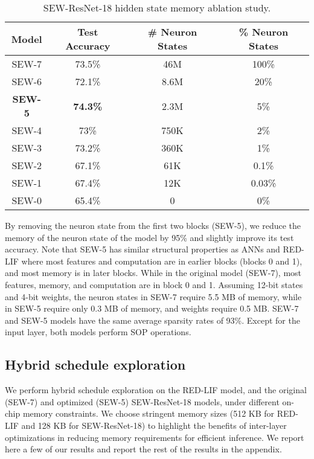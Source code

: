 \begin{table}[!t]
\caption{SEW-ResNet-18 hidden state memory ablation study.}
\label{tab:sew}
\centering
\begin{tabular}{|c||c|c|c|}
\hline
Model & Test Accuracy & \# Neuron States & \% Neuron States\\
\hline
SEW-7 & 73.5\% & 46M & 100\%\\
SEW-6 & 72.1\% & 8.6M & 20\%\\
\textbf{SEW-5} & \textbf{74.3\%} & 2.3M & 5\%\\
SEW-4 & 73\% & 750K & 2\%\\
SEW-3 & 73.2\% & 360K & 1\%\\
SEW-2 & 67.1\% & 61K & 0.1\% \\
SEW-1 & 67.4\% & 12K & 0.03\%\\
SEW-0 & 65.4\% & 0 & 0\%\\
\hline
\end{tabular}
\end{table}

By removing the neuron state from the first two blocks (SEW-5), we reduce the memory of the neuron state of the model by 95\% and slightly improve its test accuracy. Note that SEW-5 has similar structural properties as ANNs and RED-LIF where most features and computation are in earlier blocks (blocks 0 and 1), and most memory is in later blocks. While in the original model (SEW-7), most features, memory, and computation are in block 0 and 1. Assuming 12-bit states and 4-bit weights, the neuron states in SEW-7 require 5.5 MB of memory, while in SEW-5 require only 0.3 MB of memory, and weights require 0.5 MB. SEW-7 and SEW-5 models have the same average sparsity rates of 93\%. Except for the input layer, both models perform SOP operations. 

\subsection{Hybrid schedule exploration}
\label{sec:Shd}



We perform hybrid schedule exploration on the RED-LIF model, and the original (SEW-7) and optimized (SEW-5) SEW-ResNet-18 models, under different on-chip memory constraints. We choose stringent memory sizes (512 KB for RED-LIF and 128 KB for SEW-ResNet-18) to highlight the benefits of inter-layer optimizations in reducing memory requirements for efficient inference. We report here a few of our results and report the rest of the results in the appendix. 

